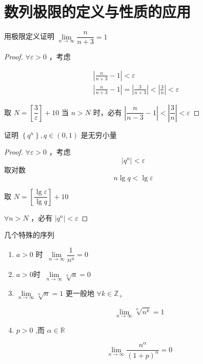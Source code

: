 \section{数列极限的定义与性质的应用}
\begin{example}
	用极限定义证明 $\lim\limits _{n \rightarrow \infty} \dfrac{n}{n+3}=1$
	
\end{example}
\begin{proof}
	$\forall \varepsilon>0$ ，考虑
	
	$$
	\begin{aligned}
		& \left|\frac{n}{n+3}-1\right|<\varepsilon \\
		& \left|\frac{n}{n+3}-1\right|=\left|\frac{3}{n+3}\right|<\left|\frac{3}{n}\right|<\varepsilon
	\end{aligned}
	$$
	
	
	取 $N=\left[\dfrac{3}{\varepsilon}\right]+10$
	当 $n>N$ 时，必有 $\left|\dfrac{n}{n-3}-1\right|<\left|\dfrac{3}{n}\right|<\varepsilon$
\end{proof}
\begin{example}
	证明 $\left\{q^n\right\}, q \in(0,1)$ 是无穷小量
\end{example}
\begin{proof}
	$\forall \varepsilon>0$ ，考虑
	$$	\left|q^n\right|<\varepsilon $$
	取对数
	$$n \lg q<\lg \varepsilon$$
	
	
	取 $N=\left[\dfrac{\lg \varepsilon}{\lg q}\right]+10$
	
	$\forall n>N$ ，必有 $\left|q^n\right|<\varepsilon$
\end{proof}
\begin{proposition}\label{几个特殊的序列}
	几个特殊的序列
	\begin{enumerate}
		\item $a>0$ 时 $~\lim\limits _{n \rightarrow \infty} \dfrac{1}{n^a}=0$
		\item $a>0$时 $~\lim\limits _{n \rightarrow \infty} \sqrt[n]{a}=0$
		\item $\lim\limits _{n \rightarrow \infty} \sqrt[n]{n}=1$
		更一般地 $\forall k \in \mathbb{Z}_{+}$
		
		$$
		\lim _{n \rightarrow \infty} \sqrt[n]{n^k}=1
		$$
		\item $p>0$ ,而 $\alpha \in \mathbb{R}$
		
		$$
		\lim _{n \rightarrow \infty} \frac{n^\alpha}{(1+p)^n}=0
		$$
	\end{enumerate}
	
\end{proposition}
